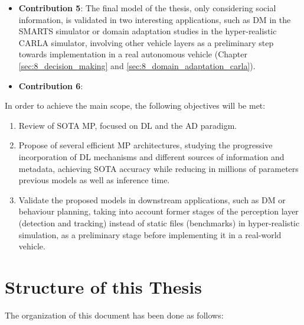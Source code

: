 \begin{itemize}
	\item \textbf{Contribution 5}: The final model of the thesis, only considering social information, is validated in two interesting applications, such as \ac{DM} in the SMARTS simulator or domain adaptation studies in the hyper-realistic CARLA simulator, involving other vehicle layers as a preliminary step towards implementation in a real autonomous vehicle (Chapter \ref{sec:8_decision_making} and \ref{sec:8_domain_adaptation_carla}). 
	
	\item \textbf{Contribution 6}:
	 
\end{itemize}
In order to achieve the main scope, the following objectives will be met:

\begin{enumerate}
	
	\item Review of \ac{SOTA} \ac{MP}, focused on \ac{DL} and the \ac{AD} paradigm.
	
	\item Propose of several efficient \ac{MP} architectures, studying the progressive incorporation of \ac{DL} mechanisms and different sources of information and metadata, achieving \ac{SOTA} accuracy while reducing in millions of parameters previous models as well as inference time.
	
	\item Validate the proposed models in downstream applications, such as \ac{DM} or behaviour planning, taking into account former stages of the perception layer (detection and tracking) instead of static files (benchmarks) in hyper-realistic simulation, as a preliminary stage before implementing it in a real-world vehicle.
	
\end{enumerate}

\section{Structure of this Thesis}
\label{sec:1_structure}

The organization of this document has been done as follows:

